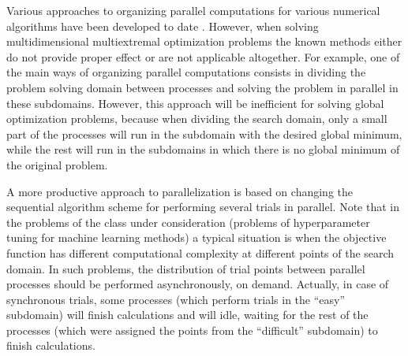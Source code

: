 \documentclass[runningheads]{llncs}
\begin{document}
Various approaches to organizing parallel computations for various numerical algorithms have been developed to date \cite{Voevodin2015}. However, when solving multidimensional multiextremal optimization problems the known methods either do not provide proper effect or are not applicable altogether. For example, one of the main ways of organizing parallel computations consists in dividing the problem solving domain between processes and solving the problem in parallel in these subdomains. However, this approach will be inefficient for solving global optimization problems, because when dividing the search domain, only a small part of the processes will run in the subdomain with the desired global minimum, while the rest will run in the subdomains in which there is no global minimum of the original problem.

A more productive approach to parallelization is based on changing the sequential algorithm scheme for performing several trials in parallel. Note that in the problems of the class under consideration (problems of hyperparameter tuning for machine learning methods) a typical situation is when the objective function has different computational complexity at different points of the search domain. In such problems, the distribution of trial points between parallel processes should be performed asynchronously, on demand. Actually, in case of synchronous trials, some processes (which perform trials in the ``easy'' subdomain) will finish calculations and will idle, waiting for the rest of the processes (which were assigned the points from the ``difficult'' subdomain) to finish calculations.
\end{document}

